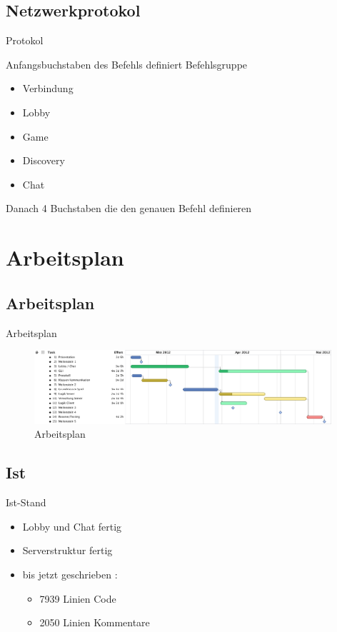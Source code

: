 \documentclass[12pt, utf8]{beamer}
\begin{document}
\subsection{Netzwerkprotokol}
\begin{frame}{Protokol}
	\begin{definition}
		Anfangsbuchstaben des Befehls definiert Befehlsgruppe
		\begin{itemize}
			\item Verbindung
			\item Lobby
			\item Game
			\item Discovery
			\item Chat
		\end{itemize}
	\end{definition}
	\begin{definition}
		Danach 4 Buchstaben die den genauen Befehl definieren
	\end{definition}
\end{frame}

\section{Arbeitsplan}
\subsection{Arbeitsplan}
\begin{frame}{Arbeitsplan}
\centering
\begin{figure}
\includegraphics[width=11cm]{images/cs108.ps}
\caption{Arbeitsplan}
	\end{figure}
\end{frame}

\subsection{Ist} 
\begin{frame}{Ist-Stand}
\begin{itemize}
\item Lobby und Chat fertig
\item Serverstruktur fertig
\item bis jetzt geschrieben :
\begin{itemize}
\item 7939 Linien Code
\item 2050 Linien Kommentare
\end{itemize}

\end{itemize}
\end{frame}
\end{document}
